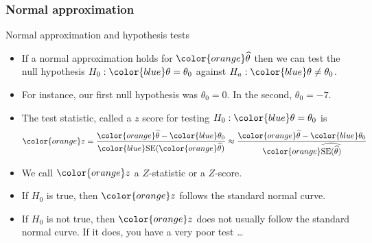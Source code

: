 \documentclass[handout]{beamer}
\begin{document}
   \begin{frame} \frametitle{Normal approximation}

    \begin{block}
     {Normal approximation and hypothesis tests}
     \begin{itemize}
     \item If a normal approximation holds
       for ${\color{orange} \widehat{\theta}}$
       then we can test the null hypothesis $H_0: {\color{blue} \theta=\theta_0}$ against $H_a: {\color{blue} \theta \neq \theta_0}$.
     \item For instance, our first null hypothesis was $\theta_0=0$. In the
     second, $\theta_0=-7$.

     \item The test statistic, called a {\color{orange} $z$ score}
     for testing $H_0:{\color{blue} \theta=\theta_0}$
     is
      $$
      {\color{orange} z} = \frac{{\color{orange} \widehat{\theta}} - {\color{blue} \theta_0}}{{\color{blue}\text{SE}({\color{orange} \widehat{\theta}})}}  \approx \frac{{\color{orange} \widehat{\theta}} - {\color{blue} \theta_0}}{{\color{orange}\widehat{\text{SE}({ \widehat{\theta}})}}}
      $$

     \item We call ${\color{orange} z}$ a $Z$-statistic or a $Z$-score.
     \item If $H_0$ is true, then ${\color{orange} z}$ follows the standard normal curve.

     \item If $H_0$ is not true, then ${\color{orange} z}$ does not usually follow the standard normal curve. If it does, you have a very poor test \dots
     \end{itemize}
   \end{block}
   \end{frame}

\end{document}
